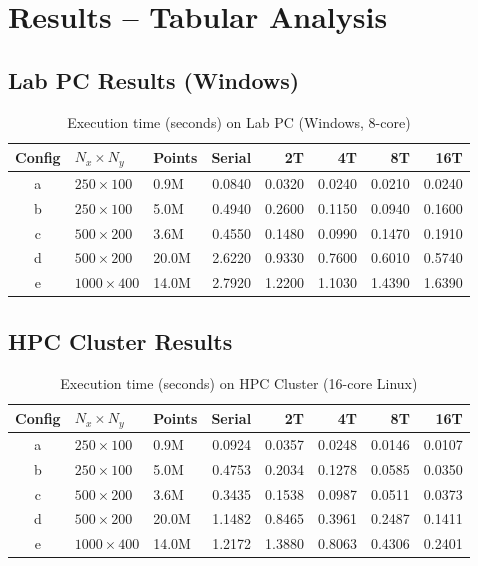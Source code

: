 \documentclass[12pt,a4paper]{article}
\begin{document}
\section{Results -- Tabular Analysis}

\subsection{Lab PC Results (Windows)}

\begin{table}[H]
\centering
\caption{Execution time (seconds) on Lab PC (Windows, 8-core)}
\label{tab:windows_time}
\begin{tabular}{cllrrrrr}
\toprule
\textbf{Config} & $N_x \times N_y$ & \textbf{Points} & \textbf{Serial} & \textbf{2T} & \textbf{4T} & \textbf{8T} & \textbf{16T} \\
\midrule
a & $250\times100$ & 0.9M & 0.0840 & 0.0320 & 0.0240 & 0.0210 & 0.0240 \\
b & $250\times100$ & 5.0M & 0.4940 & 0.2600 & 0.1150 & 0.0940 & 0.1600 \\
c & $500\times200$ & 3.6M & 0.4550 & 0.1480 & 0.0990 & 0.1470 & 0.1910 \\
d & $500\times200$ & 20.0M & 2.6220 & 0.9330 & 0.7600 & 0.6010 & 0.5740 \\
e & $1000\times400$ & 14.0M & 2.7920 & 1.2200 & 1.1030 & 1.4390 & 1.6390 \\
\bottomrule
\end{tabular}
\end{table}

\subsection{HPC Cluster Results}

\begin{table}[H]
\centering
\caption{Execution time (seconds) on HPC Cluster (16-core Linux)}
\label{tab:cluster_time}
\begin{tabular}{cllrrrrr}
\toprule
\textbf{Config} & $N_x \times N_y$ & \textbf{Points} & \textbf{Serial} & \textbf{2T} & \textbf{4T} & \textbf{8T} & \textbf{16T} \\
\midrule
a & $250\times100$ & 0.9M & 0.0924 & 0.0357 & 0.0248 & 0.0146 & 0.0107 \\
b & $250\times100$ & 5.0M & 0.4753 & 0.2034 & 0.1278 & 0.0585 & 0.0350 \\
c & $500\times200$ & 3.6M & 0.3435 & 0.1538 & 0.0987 & 0.0511 & 0.0373 \\
d & $500\times200$ & 20.0M & 1.1482 & 0.8465 & 0.3961 & 0.2487 & 0.1411 \\
e & $1000\times400$ & 14.0M & 1.2172 & 1.3880 & 0.8063 & 0.4306 & 0.2401 \\
\bottomrule
\end{tabular}
\end{table}
\end{document}
